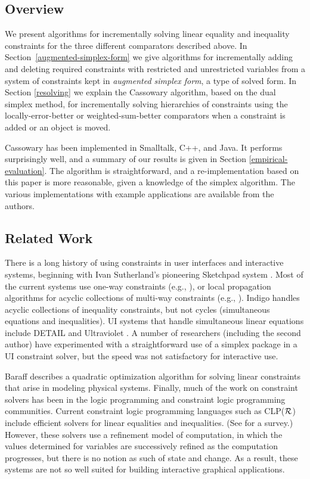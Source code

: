 \documentclass{article}
\begin{document}
\subsection{Overview}

We present algorithms for incrementally solving linear equality and
inequality constraints for the three different comparators described
above. In Section~\ref{augmented-simplex-form} we give algorithms for
incrementally adding and deleting required constraints with restricted and
unrestricted variables from a system of constraints kept in \emph{augmented
simplex form}, a type of solved form.  In Section \ref{resolving} we
explain the Cassowary algorithm, based on the dual simplex method, for incrementally
solving hierarchies of constraints using the locally-error-better or
weighted-sum-better comparators when a constraint is added or an object is
moved.

Cassowary has been implemented in Smalltalk, C++, and Java. It performs
surprisingly well, and a summary of our results is given in Section
\ref{empirical-evaluation}.  The algorithm is straightforward, and a
re-implementation based on this paper is more reasonable, given a
knowledge of the simplex algorithm.  The various implementations with
example applications are available from the authors.

\subsection{Related Work}

There is a long history of using constraints in user interfaces and
interactive systems, beginning with Ivan Sutherland's pioneering Sketchpad
system \cite{sutherland-ifips-63}.  Most of the current systems use one-way
constraints (e.g., \cite{hudson-subarctic-manual,myers-chi-96}), or local
propagation algorithms for acyclic collections of multi-way constraints
(e.g., \cite{sannella-spe-93,vander-zanden-toplas-96}).
Indigo \cite{borning-uist-96} handles acyclic collections of inequality
constraints, but not cycles (simultaneous equations and inequalities).  UI
systems that handle simultaneous linear equations include \mbox{DETAIL}
\cite{hosobe-cp-96} and Ultraviolet \cite{borning-cp-95}.  A number of
researchers (including the second author) have experimented with a
straightforward use of a simplex package in a UI constraint solver,
but the speed was not satisfactory for interactive use.

Baraff \cite{baraff-siggraph-94} describes a quadratic optimization
algorithm for solving linear constraints that arise in modeling physical
systems.  Finally, much of the work on constraint solvers
has been in the logic programming and constraint logic programming
communities.  Current constraint logic programming languages such as
CLP($\cal R$) \cite{jaffar-toplas-92} include efficient solvers for linear
equalities and inequalities.  (See \cite{marriott-stuckey-book} for a
survey.)  However, these solvers use a refinement model of computation, in
which the values determined for variables are successively refined as the
computation progresses, but there is no notion as such of state and change.
As a result, these systems are not so well suited for building interactive
graphical applications.
\end{document}
